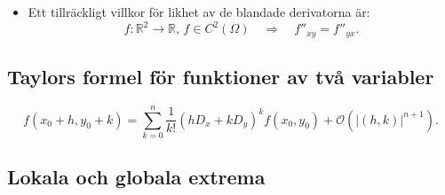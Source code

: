 \documentclass{article}
\newcommand\Ordo{\mathcal O}
\let\ergo\Longrightarrow
\def\Rone{{\mathbb R}}
\begin{document}
\begin{itemize}
\item %
     {Ett tillräckligt villkor för likhet av de blandade derivatorna är:}
  $$
  f:\Rone^2\to\Rone,\, f\in C^2(\Omega) \quad\ergo\quad f''_{xy}=f''_{yx}.
  $$%

\end{itemize}


\subsection*{
   {Taylors formel för funktioner av två variabler}
}

\[
f(x_0+h,y_0+k)
= \sum_{k=0}^n \frac1{k!}(hD_x+kD_y)^kf(x_0,y_0) + \Ordo(|(h,k)|^{n+1}).
\]

\subsection*{
   {Lokala och globala extrema}
}
\end{document}
